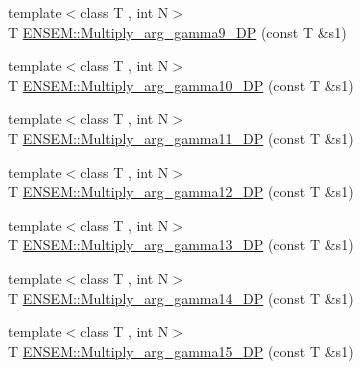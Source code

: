 \begin{DoxyCompactItemize}
\item 
{\footnotesize template$<$class T , int N$>$ }\\T \mbox{\hyperlink{namespaceENSEM_a223eca565597626d30b331276e97c32d}{E\+N\+S\+E\+M\+::\+Multiply\+\_\+arg\+\_\+gamma9\+\_\+\+DP}} (const T \&s1)
\item 
{\footnotesize template$<$class T , int N$>$ }\\T \mbox{\hyperlink{namespaceENSEM_af4e553a9453429a592725dd4ab7a6b1d}{E\+N\+S\+E\+M\+::\+Multiply\+\_\+arg\+\_\+gamma10\+\_\+\+DP}} (const T \&s1)
\item 
{\footnotesize template$<$class T , int N$>$ }\\T \mbox{\hyperlink{namespaceENSEM_acc18dd51105f008d99800a117f284872}{E\+N\+S\+E\+M\+::\+Multiply\+\_\+arg\+\_\+gamma11\+\_\+\+DP}} (const T \&s1)
\item 
{\footnotesize template$<$class T , int N$>$ }\\T \mbox{\hyperlink{namespaceENSEM_adb0071f13d0d62199ef3077b2f9d1c41}{E\+N\+S\+E\+M\+::\+Multiply\+\_\+arg\+\_\+gamma12\+\_\+\+DP}} (const T \&s1)
\item 
{\footnotesize template$<$class T , int N$>$ }\\T \mbox{\hyperlink{namespaceENSEM_a124549d43453b8c8fe7d8d501c0aadbf}{E\+N\+S\+E\+M\+::\+Multiply\+\_\+arg\+\_\+gamma13\+\_\+\+DP}} (const T \&s1)
\item 
{\footnotesize template$<$class T , int N$>$ }\\T \mbox{\hyperlink{namespaceENSEM_a6ccb5e56860592ee24e7da603a522c7a}{E\+N\+S\+E\+M\+::\+Multiply\+\_\+arg\+\_\+gamma14\+\_\+\+DP}} (const T \&s1)
\item 
{\footnotesize template$<$class T , int N$>$ }\\T \mbox{\hyperlink{namespaceENSEM_ab24a3a41aeb943ec71c06de029e9540b}{E\+N\+S\+E\+M\+::\+Multiply\+\_\+arg\+\_\+gamma15\+\_\+\+DP}} (const T \&s1)
\end{DoxyCompactItemize}
